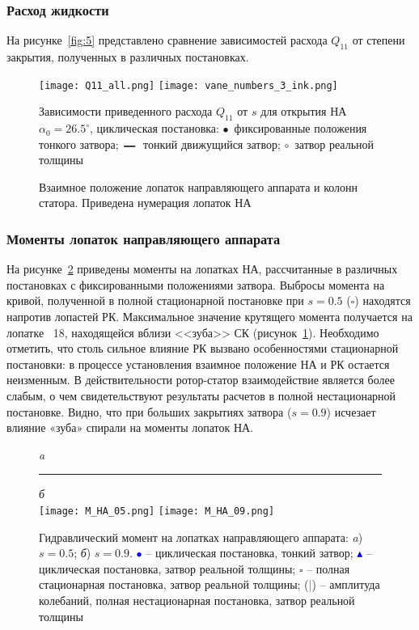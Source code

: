 \subsubsection{Расход жидкости}
\label{s:4521}
На рисунке~\ref{fig:5} представлено сравнение 
зависимостей расхода $Q_{11}$ от степени закрытия, полученных в различных постановках.
\begin{figure}[htb]
  \texttt{[image: Q11\_all.png]} \hfill\texttt{[image: vane\_numbers\_3\_ink.png]}\\
  \parbox{9cm} {\caption{Зависимости приведенного расхода $Q_{11}$ от $s$ для открытия НА  
  $\alpha_0=26.5^\circ$, циклическая постановка: $\bullet$~фиксированные положения тонкого затвора; 
  \textcolor{blue}{$\genfrac{}{}{1pt}{2}{\quad}{  }$}~тонкий движущийся затвор; $\circ$~затвор реальной 
  толщины}
  \label{fig:5}}\hfill
  \parbox{8cm} {\caption{Взаимное положение лопаток направляющего аппарата и колонн статора. Приведена
                         нумерация лопаток НА}\label{fig:55}}
\end{figure}
\subsubsection{Моменты лопаток направляющего аппарата}
\label{s:4522}
На рисунке~\ref{fig:6} приведены моменты на лопатках НА, рассчитанные в различных постановках с фиксированными 
положениями затвора. Выбросы момента на кривой, полученной в полной стационарной постановке 
при $s=0.5$ ($\square$) находятся напротив лопастей РК. Максимальное значение крутящего момента получается на 
лопатке \No~18, находящейся вблизи <<зуба>> СК (рисунок~\ref{fig:55}). Необходимо отметить, что столь сильное 
влияние РК вызвано особенностями стационарной постановки: в процессе установления взаимное положение НА и РК 
остается неизменным. В действительности ротор-статор взаимодействие является более слабым, о чем 
свидетельствуют результаты расчетов в полной нестационарной 
постановке. Видно, 
что при больших закрытиях затвора ($s=0.9$) исчезает влияние «зуба» спирали на моменты лопаток НА. 
\begin{figure}[h!]
  \centering \small \emph{a}\rule{90mm}{0mm}\emph{б}\\[0.3mm]
  {\texttt{[image: M\_HA\_05.png]}}\hfill
  {\texttt{[image: M\_HA\_09.png]}}\\[0.3mm]  
  \caption{Гидравлический момент на лопатках направляющего аппарата: \emph{a}) $s=0.5$; \emph{б}) $s=0.9$.
  \textcolor{blue}{$\bullet$} -- циклическая постановка, тонкий затвор; 
  \textcolor{blue}{$\blacktriangle$} -- циклическая постановка, затвор реальной толщины; 
  $\square$ -- полная стационарная постановка, затвор реальной толщины; 
  (\textcolor{red}{|}) -- амплитуда колебаний, полная нестационарная постановка, затвор реальной толщины}
  \label{fig:6} \vspace{-5mm}
\end{figure}
